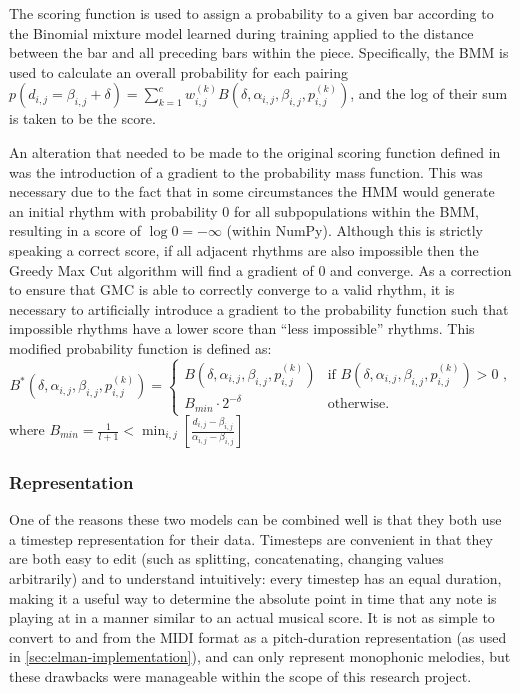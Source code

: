 \documentclass[ author={Stephen Livermore-Tozer},
				supervisor={Dr. Peter Flach},
				degree={MEng},
				title={Performing Algorithmic Co-composition Using Machine Learning},
				subtitle={},
				type={research},
				year={2016} ]{dissertation}
\begin{document}
	The scoring function is used to assign a probability to a given bar according to the Binomial mixture model learned during training applied to the distance between the bar and all preceding bars within the piece. Specifically, the BMM is used to calculate an overall probability for each pairing $p(d_{i,j} = \beta_{i,j} + \delta) = \sum_{k=1}^{c} w_{i,j}^{(k)} B(\delta,\alpha_{i,j},\beta_{i,j},p_{i,j}^{(k)})$, and the log of their sum is taken to be the score.
	
	An alteration that needed to be made to the original scoring function defined in \cite{paiement2007generative} was the introduction of a gradient to the probability mass function. This was necessary due to the fact that in some circumstances the HMM would generate an initial rhythm with probability $0$ for all subpopulations within the BMM, resulting in a score of $\log 0 = -\infty$ (within NumPy). Although this is strictly speaking a correct score, if all adjacent rhythms are also impossible then the Greedy Max Cut algorithm will find a gradient of $0$ and converge. As a correction to ensure that GMC is able to correctly converge to a valid rhythm, it is necessary to artificially introduce a gradient to the probability function such that impossible rhythms have a lower score than ``less impossible'' rhythms. This modified probability function is defined as:
	$$B^*(\delta,\alpha_{i,j},\beta_{i,j},p_{i,j}^{(k)}) =
	\begin{cases}
		B(\delta,\alpha_{i,j},\beta_{i,j},p_{i,j}^{(k)}) & \text{if } B(\delta,\alpha_{i,j},\beta_{i,j},p_{i,j}^{(k)}) > 0 \textbf{ ,} \\
		B_{min} \cdot 2^{-\delta} & \text{otherwise.}
	\end{cases}$$
	where $B_{min} = \frac{1}{l+1} < \min_{i,j} \left[ \frac{d_{i,j} - \beta_{i,j}}{\alpha_{i,j} - \beta_{i,j}} \right]$
	
	\subsubsection{Representation}
	
	One of the reasons these two models can be combined well is that they both use a timestep representation for their data. Timesteps are convenient in that they are both easy to edit (such as splitting, concatenating, changing values arbitrarily) and to understand intuitively: every timestep has an equal duration, making it a useful way to determine the absolute point in time that any note is playing at in a manner similar to an actual musical score. It is not as simple to convert to and from the MIDI format as a pitch-duration representation (as used in \ref{sec:elman-implementation}), and can only represent monophonic melodies, but these drawbacks were manageable within the scope of this research project.
	
\end{document}
